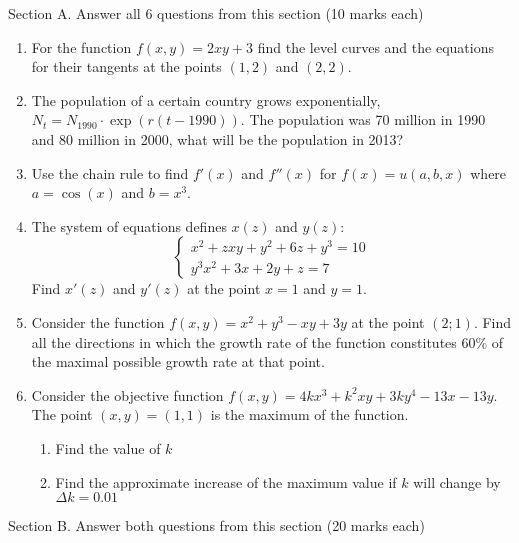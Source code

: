 \documentclass[pdftex,12pt,a4paper]{article}
\begin{document}
Section A. Answer all 6 questions from this section (10 marks each) 

\begin{enumerate}

\item For the function $f(x,y)=2xy+3$ find the level curves and the equations for their tangents at the points $(1,2)$ and $(2, 2)$.

\item The population of a certain country grows exponentially, $N_t= N_{1990}\cdot \exp (r(t-1990))$. The population was 70 million in 1990 and 80 million in 2000,
what will be the population in 2013?

\item Use the chain rule to find $f'(x)$ and $f''(x)$ for $f(x)=u(a,b,x)$ where $a=\cos(x)$ and $b=x^3$.

\item The system of equations defines $x(z)$ and $y(z)$:
\begin{equation}
\begin{cases}
x^2+zxy+y^2+6z+y^3=10 \\
y^3x^2+3x+2y+z=7 \nonumber
\end{cases}
\end{equation}
Find $x'(z)$ and $y'(z)$ at the point $x=1$ and $y=1$.

\item Consider the function $f(x,y)=x^2+y^3-xy+3y$ at the point $(2;1)$. Find all the directions in which the  growth rate of the function constitutes $60\%$ of the maximal possible growth rate at that point.

\item Consider the objective function $f(x,y)=4kx^3+k^2xy+3ky^4-13x-13y$. The point $(x,y)=(1,1)$ is the maximum of the function. 
\begin{enumerate}
\item Find the value of $k$
\item Find the approximate increase of the maximum value if $k$ will change by $\Delta k=0.01$
\end{enumerate}


\end{enumerate}

Section B. Answer both questions from this section (20 marks each) 
\end{document}
